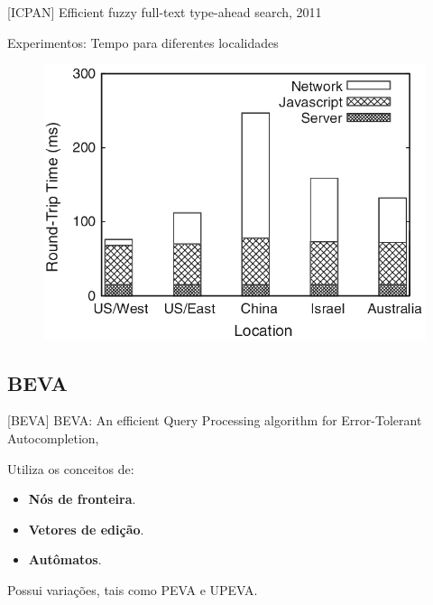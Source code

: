 \documentclass[11pt]{beamer}
\begin{document}
\begin{frame}{[ICPAN] Efficient fuzzy full-text type-ahead search, 2011}
    
    Experimentos: Tempo para diferentes localidades

    \begin{figure}
      \includegraphics[scale=0.35]{pictures/icpan_10_ex.png}
      \centering
    \end{figure}
    
\end{frame}

\subsection{BEVA}

\begin{frame}{[BEVA] BEVA: An efficient Query Processing algorithm for Error-Tolerant Autocompletion, \cite{BEVA}}

    \large
    Utiliza os conceitos de:
    
    \begin{itemize}
        \item \textbf{Nós de fronteira}. 
        \item \textbf{Vetores de edição}.
        \item \textbf{Autômatos}.
    \end{itemize}
    
    Possui variações, tais como PEVA e UPEVA.
    
\end{frame}
\end{document}
